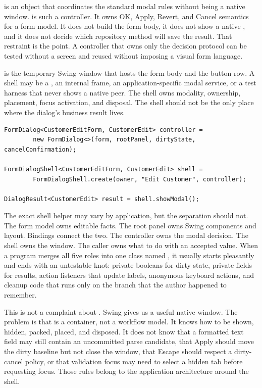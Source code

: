  is an object that coordinates the
standard modal rules without being a native window.  is such a
controller. It owns OK, Apply, Revert, and Cancel semantics for a form model. It does
not build the form body, it does not show a native , and it does
not decide which repository method will save the result. That restraint is the
point. A controller that owns only the decision protocol can be tested without a
screen and reused without imposing a visual form language.

 is the temporary Swing window that hosts
the form body and the button row. A shell may be a , an internal
frame, an application-specific modal service, or a test harness that never
shows a native peer. The shell owns modality, ownership, placement, focus
activation, and disposal. The shell should not be the only place where the
dialog's business result lives.

\begin{lstlisting}[caption={Controller first, native shell second.}]
FormDialog<CustomerEditForm, CustomerEdit> controller =
        new FormDialog<>(form, rootPanel, dirtyState, cancelConfirmation);

FormDialogShell<CustomerEditForm, CustomerEdit> shell =
        FormDialogShell.create(owner, "Edit Customer", controller);

DialogResult<CustomerEdit> result = shell.showModal();
\end{lstlisting}

The exact shell helper may vary by application, but the separation should not.
The form model owns editable facts. The root panel owns Swing components and
layout. Bindings connect the two. The controller owns the modal decision. The
shell owns the window. The caller owns what to do with an accepted value. When a
program merges all five roles into one class named , it
usually starts pleasantly and ends with an untestable knot: private booleans for
dirty state, private fields for results, action listeners that update labels,
anonymous keyboard actions, and cleanup code that runs only on the branch that
the author happened to remember.

This is not a complaint about . Swing gives us a useful native
window. The problem is that  is a container, not a workflow model.
It knows how to be shown, hidden, packed, placed, and disposed. It does not know
that a formatted text field may still contain an uncommitted parse candidate,
that Apply should move the dirty baseline but not close the window, that Escape
should respect a dirty-cancel policy, or that validation focus may need to
select a hidden tab before requesting focus. Those rules belong to the
application architecture around the shell.

